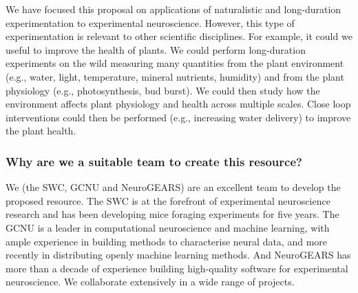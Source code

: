 We have focused this proposal on applications of naturalistic and long-duration
experimentation to experimental neuroscience. However, this type of
experimentation is relevant to other scientific disciplines. For example, it
could we useful to improve the health of plants. We could perform long-duration
experiments on the wild measuring many quantities from the plant environment
(e.g., water, light, temperature, mineral nutrients, humidity) and from the
plant physiology (e.g., photosynthesis, bud burst). We could then study how the
environment affects plant physiology and health across multiple scales. Close
loop interventions could then be performed (e.g., increasing water delivery) to
improve the plant health.

\subsubsection*{Why are we a suitable team to create this resource?}

We (the SWC, GCNU and NeuroGEARS) are an excellent team to develop the proposed
resource. The SWC is at the forefront of experimental neuroscience research and
has been developing mice foraging experiments for five years. The GCNU is a
leader in computational neuroscience and machine learning, with ample
experience in building methods to characterise neural data, and more recently
in distributing openly machine learning methods. And NeuroGEARS has more than a
decade of experience building high-quality software for experimental
neuroscience. We collaborate extensively in a wide range of projects.


